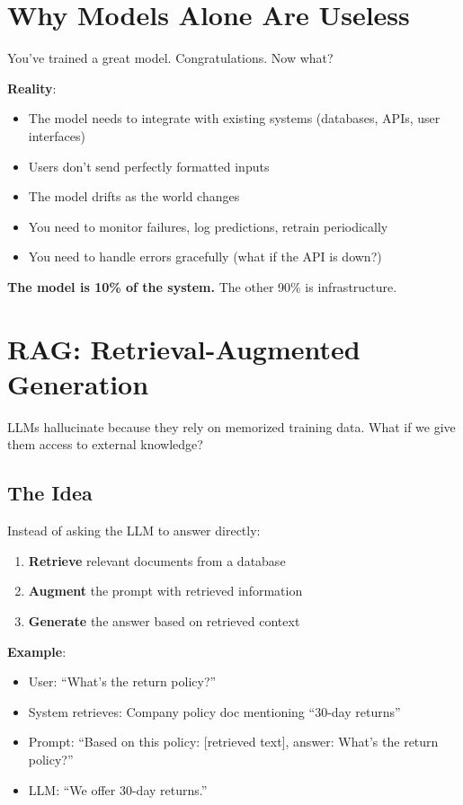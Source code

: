 \documentclass[11pt,oneside]{book}
\begin{document}
\section{Why Models Alone Are Useless}

You've trained a great model. Congratulations. Now what?

\textbf{Reality}:
\begin{itemize}
\item The model needs to integrate with existing systems (databases, APIs, user interfaces)
\item Users don't send perfectly formatted inputs
\item The model drifts as the world changes
\item You need to monitor failures, log predictions, retrain periodically
\item You need to handle errors gracefully (what if the API is down?)
\end{itemize}

\textbf{The model is 10\% of the system.} The other 90\% is infrastructure.

\section{RAG: Retrieval-Augmented Generation}

LLMs hallucinate because they rely on memorized training data. What if we give them access to external knowledge?

\subsection{The Idea}

Instead of asking the LLM to answer directly:
\begin{enumerate}
\item \textbf{Retrieve} relevant documents from a database
\item \textbf{Augment} the prompt with retrieved information
\item \textbf{Generate} the answer based on retrieved context
\end{enumerate}

\textbf{Example}:
\begin{itemize}
\item User: ``What's the return policy?''
\item System retrieves: Company policy doc mentioning ``30-day returns''
\item Prompt: ``Based on this policy: [retrieved text], answer: What's the return policy?''
\item LLM: ``We offer 30-day returns.''
\end{itemize}
\end{document}
